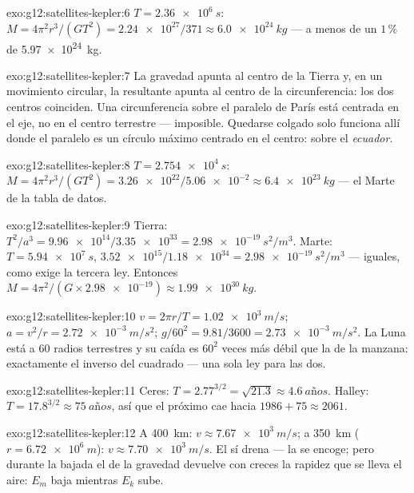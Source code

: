 \begin{solution}{exo:g12:satellites-kepler:6}
$T = \qty{2.36e6}{s}$: $M = 4\pi^2 r^3/(GT^2) = \num{2.24e27}/371
\approx \qty{6.0e24}{kg}$ --- a menos de un $1\,\%$ de
\qty{5.97e24}{kg}.
\end{solution}

\begin{solution}{exo:g12:satellites-kepler:7}
La gravedad apunta al centro de la Tierra y, en un movimiento circular,
la  resultante apunta al centro de la circunferencia: los dos
centros coinciden. Una circunferencia sobre el paralelo de París está
centrada en el eje, no en el centro terrestre --- imposible. Quedarse
colgado solo funciona allí donde el paralelo es un círculo máximo
centrado en el centro: sobre el \emph{ecuador}.
\end{solution}

\begin{solution}{exo:g12:satellites-kepler:8}
$T = \qty{2.754e4}{s}$: $M = 4\pi^2 r^3/(GT^2) =
\num{3.26e22}/\num{5.06e-2} \approx \qty{6.4e23}{kg}$ --- el Marte de la
tabla de datos.
\end{solution}

\begin{solution}{exo:g12:satellites-kepler:9}
Tierra: $T^2/a^3 = \num{9.96e14}/\num{3.35e33} =
\qty{2.98e-19}{s^2/m^3}$. Marte: $T = \qty{5.94e7}{s}$,
$\num{3.52e15}/\num{1.18e34} = \qty{2.98e-19}{s^2/m^3}$ --- iguales,
como exige la tercera ley. Entonces
$M = 4\pi^2/(G \times \num{2.98e-19}) \approx \qty{1.99e30}{kg}$.
\end{solution}

\begin{solution}{exo:g12:satellites-kepler:10}
$v = 2\pi r/T = \qty{1.02e3}{m/s}$;
$a = v^2/r = \qty{2.72e-3}{m/s^2}$;
$g/60^2 = 9.81/3600 = \qty{2.73e-3}{m/s^2}$. La Luna está a $60$ radios
terrestres y su caída es $60^2$ veces más débil que la de la manzana:
exactamente el inverso del cuadrado --- una sola ley para las dos.
\end{solution}

\begin{solution}{exo:g12:satellites-kepler:11}
Ceres: $T = 2.77^{3/2} = \sqrt{21.3} \approx \qty{4.6}{años}$. Halley:
$T = 17.8^{3/2} \approx \qty{75}{años}$, así que el próximo  cae
hacia $1986 + 75 \approx 2061$.
\end{solution}

\begin{solution}{exo:g12:satellites-kepler:12}
A \qty{400}{km}: $v \approx \qty{7.67e3}{m/s}$; a \qty{350}{km}
($r = \qty{6.72e6}{m}$): $v \approx \qty{7.70e3}{m/s}$. El  sí
drena  --- la  se encoge; pero durante la bajada
el  de la gravedad devuelve con creces la rapidez que se lleva el
aire: $E_m$ baja mientras $E_k$ sube.
\end{solution}

